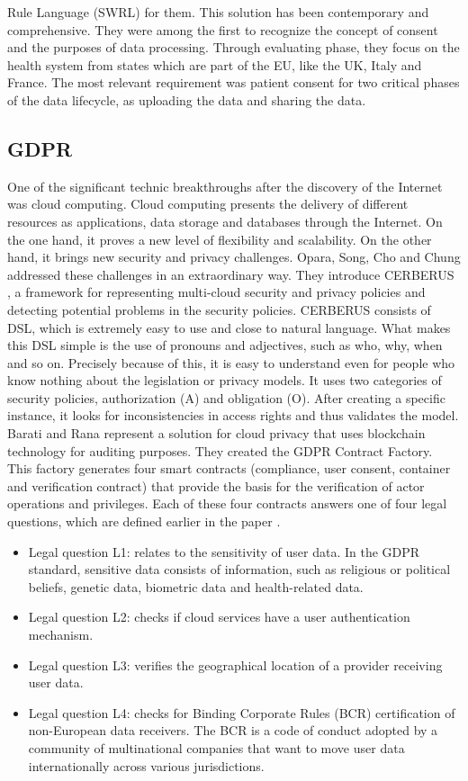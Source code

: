 \documentclass[11pt,english]{article}
\begin{document}
Rule Language (SWRL) \cite{swrl} for them. This solution has been contemporary and comprehensive. They were among the first to recognize the concept of consent and the purposes of data processing. Through evaluating phase, they focus on the health system from states which are part of the EU, like the UK, Italy and France. The most relevant requirement was patient consent for two critical phases of the data lifecycle, as uploading the data and sharing the data.
\subsection{GDPR}
One of the significant technic breakthroughs after the discovery of the Internet was cloud computing. Cloud computing presents the delivery of different resources as applications, data storage and databases through the Internet. On the one hand, it proves a new level of flexibility and scalability. On the other hand, it brings new security and privacy challenges. \newline Opara, Song, Cho and Chung addressed these challenges in an extraordinary way. They introduce CERBERUS \cite{opara2019representing}, a framework for representing multi-cloud security and privacy policies and detecting potential problems in the security policies. CERBERUS consists of DSL, which is extremely easy to use and close to natural language. What makes this DSL simple is the use of pronouns and adjectives, such as who, why, when and so on. Precisely because of this, it is easy to understand even for people who know nothing about the legislation or privacy models. It uses two categories of security policies, authorization (A) and obligation (O). After creating a specific instance, it looks for inconsistencies in access rights and thus validates the model. Barati and Rana \cite{barati2020tracking} represent a solution for cloud privacy that uses blockchain technology for auditing purposes. They created the GDPR Contract Factory. This factory generates four smart contracts (compliance, user consent, container and veriﬁcation contract) that provide the basis for the veriﬁcation of actor operations and privileges. Each of these four contracts answers one of four legal questions, which are defined earlier in the paper \cite{corrales2018smart}. 
\begin{itemize}
    \item Legal question L1: relates to the sensitivity of user data. In the GDPR standard, sensitive data consists of information, such as religious or political beliefs, genetic data, biometric data and health-related data.
    \item Legal question L2: checks if cloud services have a user
authentication mechanism.
    \item Legal question L3: veriﬁes the geographical location of a
provider receiving user data.
    \item Legal question L4: checks for Binding Corporate Rules
(BCR) certiﬁcation of non-European data receivers. The BCR is a code of conduct adopted by a community of multinational companies that want to move user data internationally across various jurisdictions.
\end{itemize}
\end{document}
